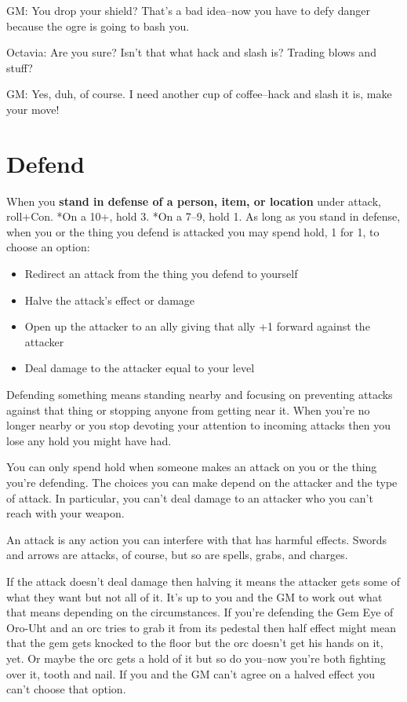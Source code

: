  GM: You drop your shield? That's a bad idea--now you have to defy danger because the ogre is going to bash you.


 Octavia: Are you sure? Isn't that what hack and slash is? Trading blows and stuff?


 GM: Yes, duh, of course. I need another cup of coffee--hack and slash it is, make your move!
\section{Defend}


 When you \textbf{stand in defense of a person, item, or location}
 under attack, roll+Con. *On a 10+, hold 3. *On a 7--9, hold 1. As long as you stand in defense, when you or the thing you defend is attacked you may spend hold, 1 for 1, to choose an option:
\begin{itemize}
\item Redirect an attack from the thing you defend to yourself
\item Halve the attack's effect or damage
\item Open up the attacker to an ally giving that ally +1 forward against the attacker
\item Deal damage to the attacker equal to your level

\end{itemize}


 Defending something means standing nearby and focusing on preventing attacks against that thing or stopping anyone from getting near it. When you're no longer nearby or you stop devoting your attention to incoming attacks then you lose any hold you might have had.


 You can only spend hold when someone makes an attack on you or the thing you're defending. The choices you can make depend on the attacker and the type of attack. In particular, you can't deal damage to an attacker who you can't reach with your weapon.


 An attack is any action you can interfere with that has harmful effects. Swords and arrows are attacks, of course, but so are spells, grabs, and charges. 


 If the attack doesn't deal damage then halving it means the attacker gets some of what they want but not all of it. It's up to you and the GM to work out what that means depending on the circumstances. If you're defending the Gem Eye of Oro-Uht and an orc tries to grab it from its pedestal then half effect might mean that the gem gets knocked to the floor but the orc doesn't get his hands on it, yet. Or maybe the orc gets a hold of it but so do you--now you're both fighting over it, tooth and nail. If you and the GM can't agree on a halved effect you can't choose that option.


